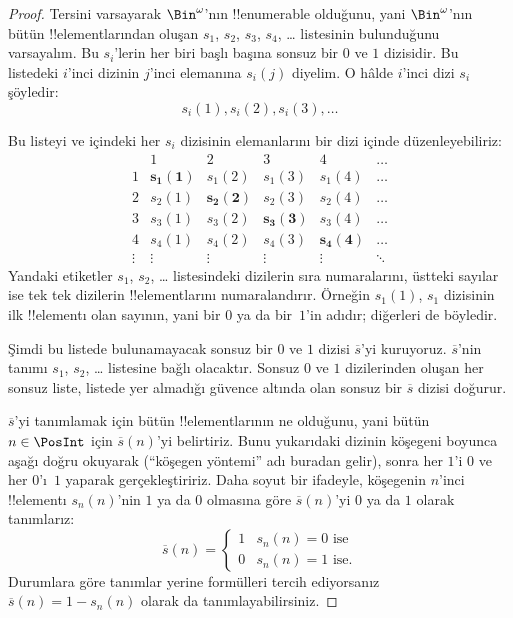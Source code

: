 \documentclass[../../../include/open-logic-section]{subfiles}
\begin{document}
\begin{proof}
Tersini varsayarak $\Bin^\omega$'nın !!{enumerable} olduğunu, yani
$\Bin^\omega$'nın bütün !!{element}larından oluşan $s_1$, $s_2$, $s_3$,
$s_4$, \dots{} listesinin bulunduğunu varsayalım. Bu $s_i$'lerin her biri
başlı başına sonsuz bir $0$ ve $1$ dizisidir. Bu listedeki $i$'inci dizinin
$j$'inci elemanına $s_i(j)$ diyelim. O hâlde $i$'inci dizi $s_i$ şöyledir:
\[
s_i(1), s_i(2), s_i(3), \dots
\]

Bu listeyi ve içindeki her $s_i$ dizisinin elemanlarını bir dizi içinde
düzenleyebiliriz:
\[
\begin{array}{c|c|c|c|c|c}
& 1 & 2 & 3 & 4 & \dots \\\hline
1 & \mathbf{s_{1}(1)} & s_{1}(2) & s_{1}(3) & s_1(4) & \dots \\\hline
2 & s_{2}(1)& \mathbf{s_{2}(2)} & s_2(3) & s_2(4) & \dots \\\hline
3 & s_{3}(1)& s_{3}(2) & \mathbf{s_3(3)} & s_3(4) & \dots \\\hline
4 & s_{4}(1)& s_{4}(2) & s_4(3) & \mathbf{s_4(4)} & \dots \\\hline
\vdots & \vdots & \vdots & \vdots & \vdots & \mathbf{\ddots}
\end{array}
\]
Yandaki etiketler $s_1$, $s_2$, \dots{} listesindeki dizilerin sıra numaralarını,
üstteki sayılar ise tek tek dizilerin !!{element}larını numaralandırır.
Örneğin $s_1(1)$, $s_1$ dizisinin ilk !!{element}ı olan sayının, yani bir
$0$ ya da bir~$1$'in adıdır; diğerleri de böyledir.

Şimdi bu listede bulunamayacak sonsuz bir $0$ ve $1$ dizisi
$\overline{s}$'yi kuruyoruz. $\overline{s}$'nin tanımı $s_1$, $s_2$,
\dots{} listesine bağlı olacaktır. Sonsuz $0$ ve $1$ dizilerinden oluşan her
sonsuz liste, listede yer almadığı güvence altında olan sonsuz bir
$\overline{s}$ dizisi doğurur.

$\overline{s}$'yi tanımlamak için bütün !!{element}larının ne olduğunu, yani
bütün $n\in\PosInt$ için $\overline{s}(n)$'yi belirtiriz. Bunu yukarıdaki
dizinin köşegeni boyunca aşağı doğru okuyarak (``köşegen yöntemi'' adı buradan
gelir), sonra her $1$'i $0$ ve her $0$'ı~$1$ yaparak gerçekleştiririz. Daha
soyut bir ifadeyle, köşegenin $n$'inci !!{element}ı $s_n(n)$'nin $1$ ya da
$0$ olmasına göre $\overline{s}(n)$'yi $0$ ya da $1$ olarak tanımlarız:
\[
\overline{s}(n) =
\begin{cases}
1 & \text{$s_{n}(n) = 0$ ise}\\
0 & \text{$s_{n}(n) = 1$ ise.}
\end{cases}
\]
Durumlara göre tanımlar yerine formülleri tercih ediyorsanız
$\overline{s}(n)=1-s_n(n)$ olarak da tanımlayabilirsiniz.


\end{proof}
\end{document}
